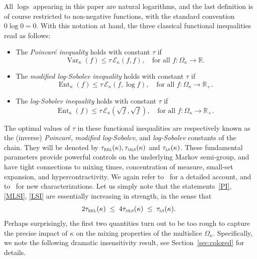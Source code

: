 \documentclass[10pt]{amsart}
\theoremstyle{definition}\newtheorem{defi}[theo]{Definition}\newtheorem{rema}[theo]{Remark}\newtheorem{exam}[theo]{Example}\newtheorem{exem}[theo]{Example}\newtheorem{nota}[theo]{Notation}
\newcommand{\R}{\mathbb{R}}
\newcommand{\cE}{\mathcal{E}}
\newcommand{\trel}{\tau_{\textsc{rel}}}
\newcommand{\tmls}{\tau_{\textsc{mls}}}
\newcommand{\tls}{\tau_{\textsc{ls}}}
\DeclareMathOperator{\ent}{Ent}
\DeclareMathOperator{\var}{Var}
\DeclareMathOperator{\logs}{logs}
\begin{document}
All $\logs$ appearing in this paper are {natural} logarithms, and the last definition is of course restricted to non-negative functions, with the standard convention $0\log 0=0$. With this notation at hand, the three classical functional inequalities read as follows:
\begin{itemize}
\item The \emph{Poincaré inequality} holds with constant $\tau$ if
\begin{equation}\label{PI}
{\var}_\kappa(f) \le \tau\, \cE_\kappa(f,f),\quad \text{for all }f\colon\Omega_\kappa\to\R.
\end{equation}
\item The \emph{modified log-Sobolev inequality} holds with constant $\tau$ if
\begin{equation}\label{MLSI}
\ent_\kappa(f) \le \tau\, \cE_\kappa\left(f,\log {f}\right),\quad \text{for all }f\colon\Omega_\kappa\to\R_+.
\end{equation}
\item The \emph{log-Sobolev inequality} holds with constant $\tau$ if
\begin{equation}\label{LSI}
\ent_\kappa(f) \le \tau\, \cE_\kappa\left(\sqrt{f},\sqrt{f}\right),\quad \text{for all }f\colon\Omega_\kappa\to\R_+.
\end{equation}
\end{itemize}


The optimal values of $\tau$ in these functional inequalities are respectively known as the (inverse) \emph{Poincaré}, \emph{modified log-Sobolev}, and \emph{log-Sobolev} constants of the chain. They will be denoted by $\trel(\kappa),\tmls(\kappa)$ and $\tls(\kappa)$. These fundamental parameters provide powerful controls on the underlying Markov semi-group, and have tight connections to mixing times, concentration of measure, small-set expansion, and hypercontractivity. We again refer to~\cite{MR2120475,MR1410112,MR2341319} for a detailed account, and to~\cite{MR3773799} for new characterizations. Let us simply note that the statements~\eqref{PI}, \eqref{MLSI}, \eqref{LSI} are essentially increasing in strength, in the sense that
\begin{equation}\label{order}
2\trel(\kappa) \; \le \; 4\tmls(\kappa) \; \le \; \tls(\kappa).
\end{equation}
Perhaps surprisingly, the first two quantities turn out to be too rough to capture the precise impact of $\kappa$ on the mixing properties of the multislice $\Omega_\kappa$. Specifically, we note the following dramatic insensitivity result, see Section~\ref{sec:colored} for details.
\end{document}
